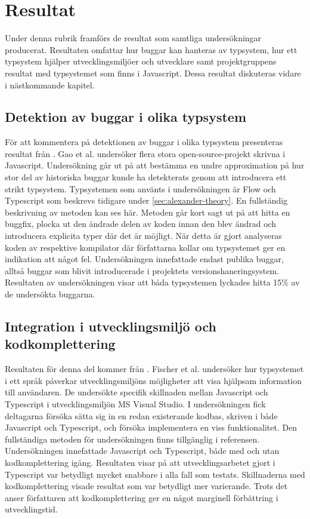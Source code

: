 \section{Resultat}
\label{sec:alexander-results}

Under denna rubrik framförs de resultat som samtliga undersökningar producerat. Resultaten omfattar hur buggar kan hanteras av typsystem, hur ett typsystem hjälper utvecklingsmiljöer och utvecklare samt projektgruppens resultat med typsystemet som finns i Javascript. Dessa resultat diskuteras vidare i nästkommande kapitel.

\subsection{Detektion av buggar i olika typsystem}
För att kommentera på detektionen av buggar i olika typsystem presenteras resultat från \cite{type-or-not-proceed}. Gao et al. undersöker flera stora open-source-projekt skrivna i Javascript.  Undersökning går ut på att bestämma en undre approximation på hur stor del av historiska buggar kunde ha detekterats genom att introducera ett strikt typsystem. Typsystemen som använts i undersökningen är Flow och Typescript som beskrevs tidigare under \ref{sec:alexander-theory}. En fullständig beskrivning av metoden kan ses här\cite{type-case-study}. Metoden går kort sagt ut på att hitta en buggfix, plocka ut den ändrade delen av koden innan den blev ändrad och introducera explicita typer där det är möjligt. När detta är gjort analyseras koden av respektive kompilator där författarna kollar om typsystemet ger en indikation att något fel. Undersökningen innefattade endast publika buggar, alltså buggar som blivit introducerade i projektets versionshaneringsystem. Resultaten av undersökningen visar att båda typsystemen lyckades hitta 15\% av de undersökta buggarna. 

\subsection{Integration i utvecklingsmiljö och kodkomplettering}
Resultaten för denna del kommer från \cite{Fischer:2015:EIE:2816707.2816720}. Fischer et al. undersöker hur typsystemet i ett språk påverkar utvecklingsmiljöns möjligheter att visa hjälpsam information till användaren. De undersökte specifik skillnaden mellan Javascript och Typescript i utvecklingsmiljön MS Visual Studio. I undersökningen fick deltagarna försöka sätta sig in en redan existerande kodbas, skriven i både Javascript och Typescript, och försöka implementera en viss funktionalitet. Den fullständiga metoden för undersökningen finns tillgänglig i referensen. Undersökningen innefattade Javascript och Typescript, både med och utan kodkomplettering igång. Resultaten visar på att utvecklingsarbetet gjort i Typescript var betydligt mycket snabbare i alla fall som testats. Skillnaderna med kodkomplettering visade resultat som var betydligt mer varierande. Trots det anser författaren att kodkomplettering ger en något marginell förbättring i utvecklingstid.

